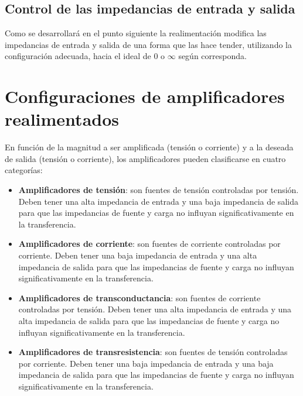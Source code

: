 \subsection{Control de las impedancias de entrada y salida}

\hspace{10pt} Como se desarrollará en el punto siguiente la realimentación
modifica las impedancias de entrada y salida de una forma que las
hace tender, utilizando la configuración adecuada, hacia el ideal de
$0$ o $\infty$ según corresponda.

\section{Configuraciones de amplificadores realimentados}

\hspace{10pt} En función de la magnitud a ser amplificada (tensión o corriente) y
a la deseada de salida (tensión o corriente), los
amplificadores pueden clasificarse en cuatro categorías:
\begin{itemize}
	\item \textbf{Amplificadores de tensión}: son fuentes de
	tensión controladas por tensión. Deben tener una alta impedancia
	de entrada y una baja impedancia de salida para que las
	impedancias de fuente y carga no influyan significativamente en la transferencia.
	\item \textbf{Amplificadores de corriente}: son fuentes de
	corriente controladas por corriente. Deben tener una baja impedancia
	de entrada y una alta impedancia de salida para que las
	impedancias de fuente y carga no influyan significativamente en la transferencia.
	\item \textbf{Amplificadores de transconductancia}: son fuentes de
	corriente controladas por tensión. Deben tener una alta impedancia
	de entrada y una alta impedancia de salida para que las
	impedancias de fuente y carga no influyan significativamente en la transferencia.
	\item \textbf{Amplificadores de transresistencia}: son fuentes de
	tensión controladas por corriente. Deben tener una baja impedancia
	de entrada y una baja impedancia de salida para que las
	impedancias de fuente y carga no influyan significativamente en la transferencia.
\end{itemize}

